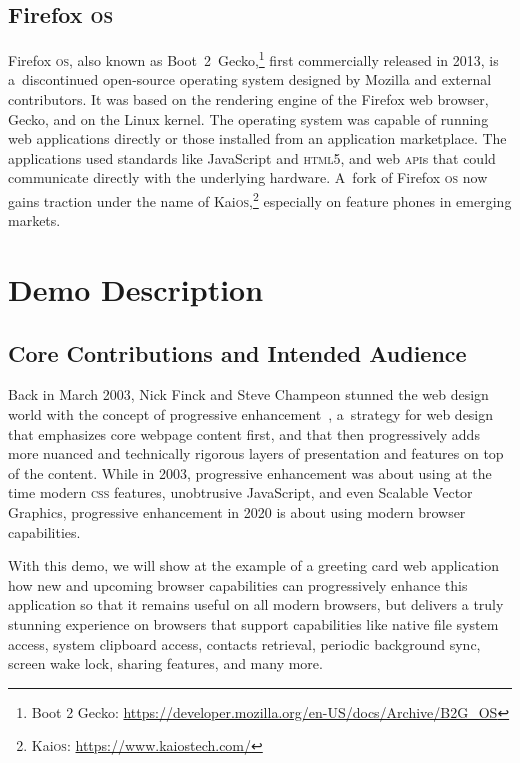 \documentclass[sigconf, anonymous]{acmart}
\begin{document}
\subsection{Firefox \textsc{os}}

Firefox \textsc{os}, also known as
Boot~2~Gecko,\footnote{Boot 2 Gecko: \url{https://developer.mozilla.org/en-US/docs/Archive/B2G_OS}}
first commercially released in 2013,
is a~discontinued open-source operating system
designed by Mozilla and external contributors.
It was based on the rendering engine of the Firefox web browser, Gecko,
and on the Linux kernel.
The operating system was capable of running web applications directly
or those installed from an application marketplace.
The applications used standards like JavaScript and \textsc{html}5,
and web \textsc{api}s that could communicate directly with the underlying hardware.
A~fork of Firefox \textsc{os} now gains traction under the name of
Kai\textsc{os},\footnote{Kai\textsc{os}: \url{https://www.kaiostech.com/}}
especially on feature phones in emerging markets.

\section{Demo Description}

\subsection{Core Contributions and Intended Audience}

Back in March 2003, Nick Finck and Steve Champeon stunned the web design world
with the concept of progressive enhancement~\cite{champeon03},
a~strategy for web design that emphasizes core webpage content first,
and that then progressively adds more nuanced and technically rigorous layers
of presentation and features on top of the content.
While in 2003, progressive enhancement was about using at the time modern \textsc{css} features,
unobtrusive JavaScript, and even Scalable Vector Graphics,
progressive enhancement in 2020 is about using modern browser capabilities.

With this demo, we will show at the example of a greeting card web application
how new and upcoming browser capabilities can progressively enhance
this application so that it remains useful on all modern browsers,
but delivers a truly stunning experience on browsers that support capabilities
like native file system access, system clipboard access, contacts retrieval,
periodic background sync, screen wake lock, sharing features, and many more.
\end{document}
